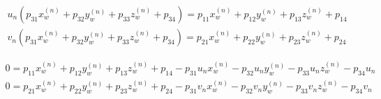 \begin{align*}
    u_n(p_{31}x_w^{(n)} + p_{32}y_w^{(n)} + p_{33}z_w^{(n)} + p_{34}) = p_{11}x_w^{(n)} + p_{12}y_w^{(n)} + p_{13}z_w^{(n)} + p_{14} \\
    v_n(p_{31}x_w^{(n)} + p_{32}y_w^{(n)} + p_{33}z_w^{(n)} + p_{34}) = p_{21}x_w^{(n)} + p_{22}y_w^{(n)} + p_{23}z_w^{(n)} + p_{24}
\end{align*}

\begin{subequations}
    \begin{align}
        0 = p_{11}x_w^{(n)} + p_{12}y_w^{(n)} + p_{13}z_w^{(n)} + p_{14} - p_{31}u_nx_w^{(n)} - p_{32}u_ny_w^{(n)} - p_{33}u_nz_w^{(n)} - p_{34}u_n \\
        0 = p_{21}x_w^{(n)} + p_{22}y_w^{(n)} + p_{23}z_w^{(n)} + p_{24} - p_{31}v_nx_w^{(n)} - p_{32}v_ny_w^{(n)} - p_{33}v_nz_w^{(n)} - p_{34}v_n
    \end{align}
\end{subequations}

